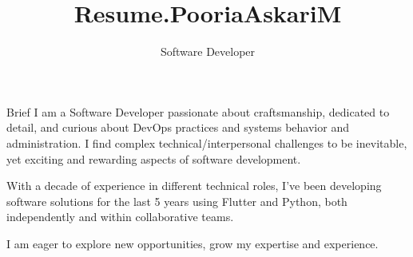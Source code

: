 \documentclass[
	a4paper, %
	12pt, %
]{resume} %
\title{Resume.PooriaAskariM}
\subtitle{Software Developer}  %
\begin{document}
\raggedright
\setlength{\headheight}{42pt} %
\setlength{\footskip}{10pt}  %



\begin{rSection}{Brief}
\bigskip
I am a Software Developer passionate about craftsmanship, dedicated to detail, and curious about DevOps practices and systems behavior and administration. I find complex technical/interpersonal challenges to be inevitable, yet exciting and rewarding aspects of software development.

With a decade of experience in different technical roles, I've been developing software solutions for the last 5 years using Flutter and Python, both independently and within collaborative teams.

I am eager to explore new opportunities, grow my expertise and experience.
\bigskip


\end{rSection}

\end{document}
